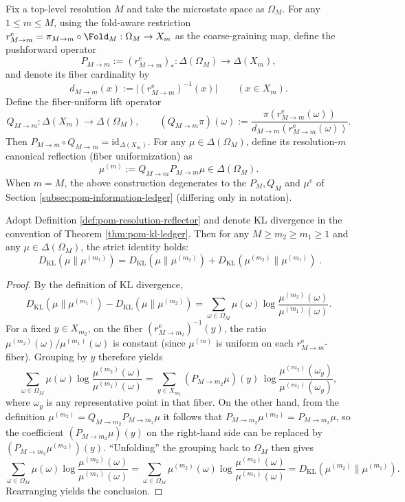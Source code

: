 \begin{definition}\label{def:pom-resolution-reflector}
Fix a top-level resolution $M$ and take the microstate space as $\Omega_M$.
For any $1\le m\le M$, using the fold-aware restriction
\(
r^{\mathrm{e}}_{M\to m}=\pi_{M\to m}\circ \Fold_M:\Omega_M\to X_m
\)
as the coarse-graining map, define the pushforward operator
\[
P_{M\to m}:=(r^{\mathrm{e}}_{M\to m})_*:\Delta(\Omega_M)\to\Delta(X_m),
\]
and denote its fiber cardinality by
\[
d_{M\to m}(x):=\bigl|(r^{\mathrm{e}}_{M\to m})^{-1}(x)\bigr|\qquad(x\in X_m).
\]
Define the fiber-uniform lift operator
\[
Q_{M\to m}:\Delta(X_m)\to\Delta(\Omega_M),
\qquad
(Q_{M\to m}\pi)(\omega):=\frac{\pi(r^{\mathrm{e}}_{M\to m}(\omega))}{d_{M\to m}(r^{\mathrm{e}}_{M\to m}(\omega))}.
\]
Then $P_{M\to m}\circ Q_{M\to m}=\mathrm{id}_{\Delta(X_m)}$.
For any $\mu\in\Delta(\Omega_M)$, define its resolution-$m$ canonical reflection (fiber uniformization) as
\[
\mu^{(m)}:=Q_{M\to m}P_{M\to m}\mu\in\Delta(\Omega_M).
\]
When $m=M$, the above construction degenerates to the $P_M,Q_M$ and $\mu^{e}$ of Section \ref{subsec:pom-information-ledger} (differing only in notation).
\end{definition}

\begin{theorem}\label{thm:pom-kl-pythagoras-tower}
Adopt Definition \ref{def:pom-resolution-reflector} and denote KL divergence in the convention of Theorem \ref{thm:pom-kl-ledger}.
Then for any $M\ge m_2\ge m_1\ge 1$ and any $\mu\in\Delta(\Omega_M)$, the strict identity holds:
\[
\boxed{\;
D_{\mathrm{KL}}(\mu\|\mu^{(m_1)})
=D_{\mathrm{KL}}(\mu\|\mu^{(m_2)})
+D_{\mathrm{KL}}(\mu^{(m_2)}\|\mu^{(m_1)})\; }.
\]
\end{theorem}
\begin{proof}
By the definition of KL divergence,
\[
D_{\mathrm{KL}}(\mu\|\mu^{(m_1)})-D_{\mathrm{KL}}(\mu\|\mu^{(m_2)})
=\sum_{\omega\in\Omega_M}\mu(\omega)\log\frac{\mu^{(m_2)}(\omega)}{\mu^{(m_1)}(\omega)}.
\]
For a fixed $y\in X_{m_2}$, on the fiber $(r^{\mathrm{e}}_{M\to m_2})^{-1}(y)$, the ratio
\(
\mu^{(m_2)}(\omega)/\mu^{(m_1)}(\omega)
\)
is constant (since $\mu^{(m)}$ is uniform on each $r^{\mathrm{e}}_{M\to m}$-fiber).
Grouping by $y$ therefore yields
\[
\sum_{\omega\in\Omega_M}\mu(\omega)\log\frac{\mu^{(m_2)}(\omega)}{\mu^{(m_1)}(\omega)}
=\sum_{y\in X_{m_2}}(P_{M\to m_2}\mu)(y)\,
\log\frac{\mu^{(m_2)}(\omega_y)}{\mu^{(m_1)}(\omega_y)},
\]
where $\omega_y$ is any representative point in that fiber.
On the other hand, from the definition \(\mu^{(m_2)}=Q_{M\to m_2}P_{M\to m_2}\mu\) it follows that
\(
P_{M\to m_2}\mu^{(m_2)}=P_{M\to m_2}\mu
\),
so the coefficient $(P_{M\to m_2}\mu)(y)$ on the right-hand side can be replaced by $(P_{M\to m_2}\mu^{(m_2)})(y)$.
``Unfolding'' the grouping back to $\Omega_M$ then gives
\[
\sum_{\omega\in\Omega_M}\mu(\omega)\log\frac{\mu^{(m_2)}(\omega)}{\mu^{(m_1)}(\omega)}
=\sum_{\omega\in\Omega_M}\mu^{(m_2)}(\omega)\log\frac{\mu^{(m_2)}(\omega)}{\mu^{(m_1)}(\omega)}
=D_{\mathrm{KL}}(\mu^{(m_2)}\|\mu^{(m_1)}).
\]
Rearranging yields the conclusion.
\end{proof}

